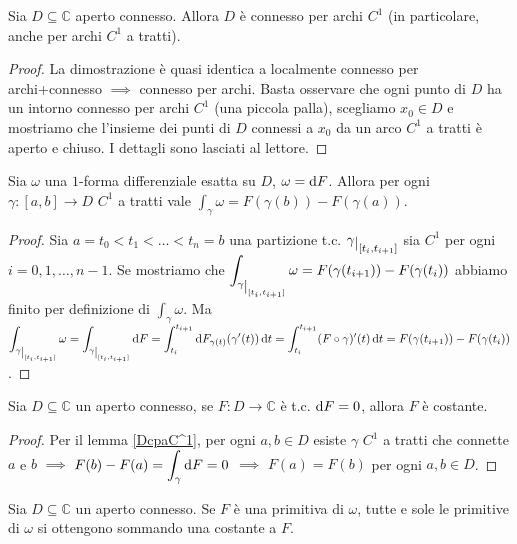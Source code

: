 \begin{lm} \label{DcpaC^1}
  Sia $D \subseteq \mathbb{C}$ aperto connesso. Allora $D$ è connesso per archi $C^1$ (in particolare, anche per archi $C^1$ a tratti).
\end{lm}

\begin{proof}
  La dimostrazione è quasi identica a localmente connesso per archi+connesso $\implies$ connesso per archi. Basta osservare che ogni punto di $D$ ha un intorno connesso per archi $C^1$ (una piccola palla), scegliamo $x_0 \in D$ e mostriamo che l'insieme dei punti di $D$ connessi a $x_0$ da un arco $C^1$ a tratti è aperto e chiuso. I dettagli sono lasciati al lettore.
\end{proof}

\begin{lm} \label{calc_prim}
  Sia $\omega$ una $1$-forma differenziale esatta su $D$, $\omega=\mathop{}\!\mathrm{d} F$. Allora per ogni $\gamma:[a, b] \longrightarrow D$ $C^1$ a tratti vale $\displaystyle \int_{\gamma} \omega=F(\gamma(b))-F(\gamma(a))$.
\end{lm}

\begin{proof}
  Sia $a=t_0<t_1<\dots<t_n=b$ una partizione t.c. $\gamma\restrict{[t_i, t_{i+1}]}$ sia $C^1$ per ogni $i=0, 1, \dots, n-1$. Se mostriamo che $\displaystyle \int_{\gamma\restrict{[t_i, t_{i+1}]}} \omega=F(\gamma(t_{i+1}))-F(\gamma(t_i))$ abbiamo finito per definizione di $\displaystyle \int_{\gamma} \omega$.
  Ma $\displaystyle \int_{\gamma\restrict{[t_i, t_{i+1}]}} \omega=\int_{\gamma\restrict{[t_i, t_{i+1}]}} \diff F=\int_{t_i}^{t_{i+1}} \diff F_{\gamma(t)}(\gamma'(t))\diff t=\int_{t_i}^{t_{i+1}} (F \circ \gamma)'(t)\diff t=F(\gamma(t_{i+1}))-F(\gamma(t_i))$.
\end{proof}

\begin{cor}
  Sia $D \subseteq \mathbb{C}$ un aperto connesso, se $F:D \longrightarrow \mathbb{C}$ è t.c. $\mathop{}\!\mathrm{d} F=0$, allora $F$ è costante.
\end{cor}

\begin{proof}
  Per il lemma \ref{DcpaC^1}, per ogni $a, b \in D$ esiste $\gamma$ $C^1$ a tratti che connette $a$ e $b$ $\implies$ $\displaystyle F(b)-F(a)=\int_{\gamma} \mathop{}\!\mathrm{d} F=0$ $\implies$ $F(a)=F(b)$ per ogni $a, b \in D$.
\end{proof}

\begin{cor}
  Sia $D \subseteq \mathbb{C}$ un aperto connesso. Se $F$ è una primitiva di $\omega$, tutte e sole le primitive di $\omega$ si ottengono sommando una costante a $F$.
\end{cor}

